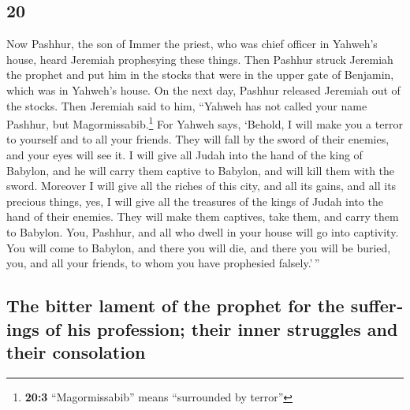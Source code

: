 \begin{paracol}{2}
\switchcolumn
\begin{otherlanguage}{english}

\hypertarget{section-39}{%
\section{20}\label{section-39}}

 Now Pashhur, the son of Immer the priest, who was chief
officer in Yahweh's house, heard Jeremiah prophesying these things.
 Then Pashhur struck Jeremiah the prophet and put him in
the stocks that were in the upper gate of Benjamin, which was in
Yahweh's house.  On the next day, Pashhur released
Jeremiah out of the stocks. Then Jeremiah said to him, ``Yahweh has not
called your name Pashhur, but Magormissabib.\footnote{\textbf{20:3}
  ``Magormissabib'' means ``surrounded by terror''}  For
Yahweh says, `Behold, I will make you a terror to yourself and to all
your friends. They will fall by the sword of their enemies, and your
eyes will see it. I will give all Judah into the hand of the king of
Babylon, and he will carry them captive to Babylon, and will kill them
with the sword.  Moreover I will give all the riches of
this city, and all its gains, and all its precious things, yes, I will
give all the treasures of the kings of Judah into the hand of their
enemies. They will make them captives, take them, and carry them to
Babylon.  You, Pashhur, and all who dwell in your house
will go into captivity. You will come to Babylon, and there you will
die, and there you will be buried, you, and all your friends, to whom
you have prophesied falsely.'\,''

\hypertarget{the-bitter-lament-of-the-prophet-for-the-sufferings-of-his-profession-their-inner-struggles-and-their-consolation}{%
\subsection{The bitter lament of the prophet for the sufferings of his
profession; their inner struggles and their
consolation}\label{the-bitter-lament-of-the-prophet-for-the-sufferings-of-his-profession-their-inner-struggles-and-their-consolation}}


\end{otherlanguage}
\end{paracol}
